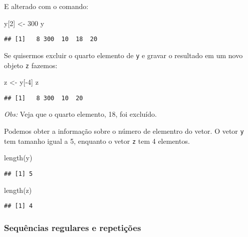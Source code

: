 \documentclass[
]{book}
\newenvironment{Shaded}{\begin{snugshade}}{\end{snugshade}}
\newcommand{\DecValTok}[1]{\textcolor[rgb]{0.00,0.00,0.81}{#1}}
\newcommand{\FunctionTok}[1]{\textcolor[rgb]{0.00,0.00,0.00}{#1}}
\newcommand{\NormalTok}[1]{#1}
\newcommand{\OtherTok}[1]{\textcolor[rgb]{0.56,0.35,0.01}{#1}}
\newcommand{\SpecialCharTok}[1]{\textcolor[rgb]{0.00,0.00,0.00}{#1}}
\begin{document}
E alterado com o comando:

\begin{Shaded}
\begin{Highlighting}[]
\NormalTok{y[}\DecValTok{2}\NormalTok{] }\OtherTok{\textless{}{-}} \DecValTok{300}
\NormalTok{y}
\end{Highlighting}
\end{Shaded}

\begin{verbatim}
## [1]   8 300  10  18  20
\end{verbatim}

Se quisermos excluir o quarto elemento de \texttt{y} e gravar o resultado em um novo objeto \texttt{z} fazemos:

\begin{Shaded}
\begin{Highlighting}[]
\NormalTok{z }\OtherTok{\textless{}{-}}\NormalTok{ y[}\SpecialCharTok{{-}}\DecValTok{4}\NormalTok{]}
\NormalTok{z}
\end{Highlighting}
\end{Shaded}

\begin{verbatim}
## [1]   8 300  10  20
\end{verbatim}

\emph{Obs:} Veja que o quarto elemento, 18, foi excluído.

Podemos obter a informação sobre o número de elementro do vetor. O vetor \texttt{y} tem tamanho igual a 5, enquanto o vetor \texttt{z} tem 4 elementos.

\begin{Shaded}
\begin{Highlighting}[]
\FunctionTok{length}\NormalTok{(y)}
\end{Highlighting}
\end{Shaded}

\begin{verbatim}
## [1] 5
\end{verbatim}

\begin{Shaded}
\begin{Highlighting}[]
\FunctionTok{length}\NormalTok{(z)}
\end{Highlighting}
\end{Shaded}

\begin{verbatim}
## [1] 4
\end{verbatim}

\hypertarget{sequuxeancias-regulares-e-repetiuxe7uxf5es}{%
\subsubsection{Sequências regulares e repetições}\label{sequuxeancias-regulares-e-repetiuxe7uxf5es}}
\end{document}
